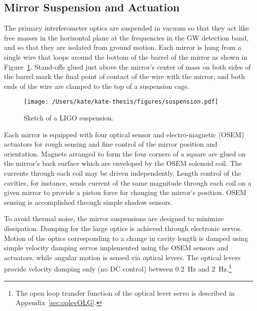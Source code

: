 



\subsection{Mirror Suspension and Actuation}
\label{sec:suspension}
The primary interferometer optics are suspended in vacuum so that they
act like free masses in the horizontal plane at the frequencies in the
GW detection band, and so that they are isolated from ground
motion. Each mirror is hung from a single wire that loops around the
bottom of the barrel of the mirror as shown in
Figure~\ref{fig:suspension}. Stand-offs glued just above the mirror's
center of mass on both sides of the barrel mark the final point of
contact of the wire with the mirror, and both ends of the wire are
clamped to the top of a suspension cage.

\begin{figure}
\begin{centering}
\texttt{[image: /Users/kate/kate-thesis/figures/suspension.pdf]}
\caption[Sketch of a LIGO suspension]{Sketch of a LIGO suspension.}
\label{fig:suspension}
\end{centering}
\end{figure}

Each mirror is equipped with four optical sensor and electro-magnetic
(OSEM) actuators for rough sensing and fine control of the mirror
position and orientation. Magnets arranged to form the four corners of
a square are glued on the mirror's back surface which are enveloped by
the OSEM solenoid coil.  The currents through each coil may be driven
independently.  Length control of the cavities, for instance, sends
current of the same magnitude through each coil on a given mirror to
provide a piston force for changing the mirror's position.  OSEM
sensing is accomplished through simple shadow sensors.

To avoid thermal noise, the mirror suspensions are designed to
minimize dissipation.  Damping for the large optics is achieved
through electronic servos.  Motion of the optics corresponding to a
change in cavity length is damped using simple velocity damping servos
implemented using the OSEM sensors and actuators, while angular motion
is sensed via optical levers.  The optical levers provide velocity
damping only (no DC control) between 0.2~Hz and 2~Hz.\footnote{ The
  open loop transfer function of the optical lever servo is described
  in Appendix~\ref{sec:oplevOLG}.  }

